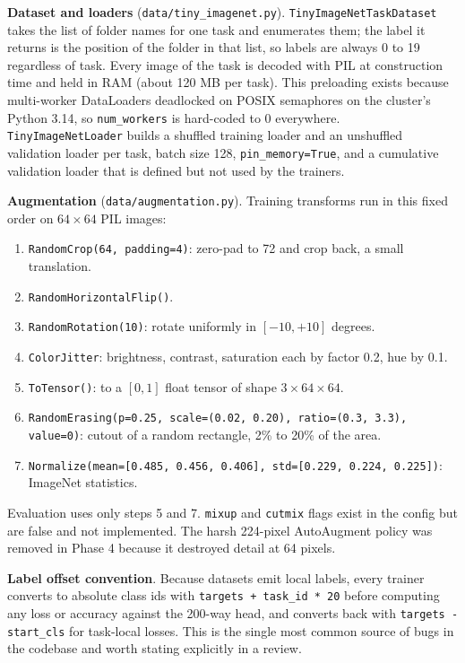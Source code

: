 \documentclass[11pt,a4paper]{article}
\newcommand{\code}[1]{\texttt{#1}}
\begin{document}
\textbf{Dataset and loaders} (\code{data/tiny\_imagenet.py}). \code{TinyImageNetTaskDataset} takes the list of folder names for one task and enumerates them; the label it returns is the position of the folder in that list, so labels are always 0 to 19 regardless of task. Every image of the task is decoded with PIL at construction time and held in RAM (about 120 MB per task). This preloading exists because multi-worker DataLoaders deadlocked on POSIX semaphores on the cluster's Python 3.14, so \code{num\_workers} is hard-coded to 0 everywhere. \code{TinyImageNetLoader} builds a shuffled training loader and an unshuffled validation loader per task, batch size 128, \code{pin\_memory=True}, and a cumulative validation loader that is defined but not used by the trainers.

\textbf{Augmentation} (\code{data/augmentation.py}). Training transforms run in this fixed order on $64 \times 64$ PIL images:
\begin{enumerate}
  \item \code{RandomCrop(64, padding=4)}: zero-pad to 72 and crop back, a small translation.
  \item \code{RandomHorizontalFlip()}.
  \item \code{RandomRotation(10)}: rotate uniformly in $[-10, +10]$ degrees.
  \item \code{ColorJitter}: brightness, contrast, saturation each by factor 0.2, hue by 0.1.
  \item \code{ToTensor()}: to a $[0, 1]$ float tensor of shape $3 \times 64 \times 64$.
  \item \code{RandomErasing(p=0.25, scale=(0.02, 0.20), ratio=(0.3, 3.3), value=0)}: cutout of a random rectangle, 2\% to 20\% of the area.
  \item \code{Normalize(mean=[0.485, 0.456, 0.406], std=[0.229, 0.224, 0.225])}: ImageNet statistics.
\end{enumerate}
Evaluation uses only steps 5 and 7. \code{mixup} and \code{cutmix} flags exist in the config but are false and not implemented. The harsh 224-pixel AutoAugment policy was removed in Phase 4 because it destroyed detail at 64 pixels.

\textbf{Label offset convention}. Because datasets emit local labels, every trainer converts to absolute class ids with \code{targets + task\_id * 20} before computing any loss or accuracy against the 200-way head, and converts back with \code{targets - start\_cls} for task-local losses. This is the single most common source of bugs in the codebase and worth stating explicitly in a review.
\end{document}

